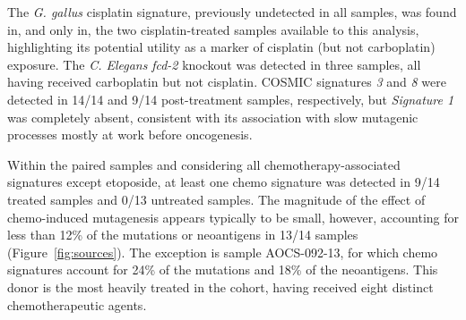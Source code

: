 The \textit{G. gallus} cisplatin signature, previously undetected in all samples, was found in, and only in, the two cisplatin-treated samples available to this analysis, highlighting its potential utility as a marker of cisplatin (but not carboplatin) exposure. The \textit{C. Elegans} \textit{fcd-2} knockout was detected in three samples, all having received carboplatin but not cisplatin. COSMIC signatures \textit{3} and \textit{8} were detected in 14/14 and 9/14 post-treatment samples, respectively, but \textit{Signature 1} was completely absent, consistent with its association with slow mutagenic processes mostly at work before oncogenesis.

Within the paired samples and considering all chemotherapy-associated signatures except etoposide, at least one chemo signature was detected in 9/14 treated samples and 0/13 untreated samples. The magnitude of the effect of chemo-induced mutagenesis appears typically to be small, however, accounting for less than 12\% of the mutations or neoantigens in 13/14 samples (Figure~\ref{fig:sources}). The exception is sample AOCS-092-13, for which chemo signatures account for 24\% of the mutations and 18\% of the neoantigens. This donor is the most heavily treated in the cohort, having received eight distinct chemotherapeutic agents.
